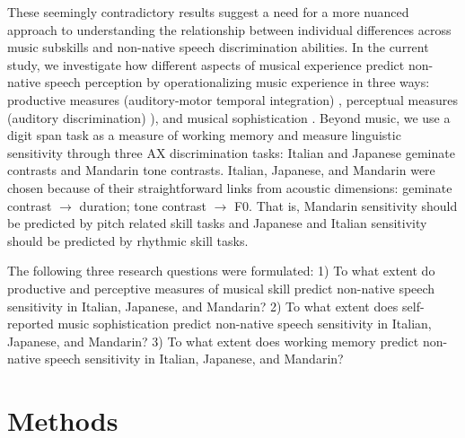 \documentclass[a4paper]{article}
\begin{document}
These seemingly contradictory results suggest a need for a more nuanced approach to understanding the relationship between individual differences across music subskills and non-native speech discrimination abilities. In the current study, we investigate how different aspects of musical experience predict non-native speech perception by operationalizing music experience in three ways: productive measures (auditory-motor temporal integration) \cite{Kachlicka_Saito_Tierney_2019}, perceptual measures (auditory discrimination) \cite[MET]{Wallentin_Nielsen_Friis-Olivarius_Vuust_Vuust_2010}), and musical sophistication \cite[Goldsmiths-MSI]{Müllensiefen_Gingras_Musil_Stewart_2014}. Beyond music, we use a digit span task as a measure of working memory and measure linguistic sensitivity through three AX discrimination tasks: Italian and Japanese geminate contrasts and Mandarin tone contrasts. Italian, Japanese, and Mandarin were chosen because of their straightforward links from acoustic dimensions: geminate contrast $\rightarrow$ duration;  tone contrast $\rightarrow$ F0. That is, Mandarin sensitivity should be predicted by pitch related skill tasks and Japanese and Italian sensitivity should be predicted by rhythmic skill tasks.

The following three research questions were formulated: 1) To what extent do productive and perceptive measures of musical skill predict non-native speech sensitivity in Italian, Japanese, and Mandarin? 2) To what extent does self-reported music sophistication predict non-native speech sensitivity in Italian, Japanese, and Mandarin? 3) To what extent does working memory predict non-native speech sensitivity in Italian, Japanese, and Mandarin?

\section{Methods}
\end{document}
